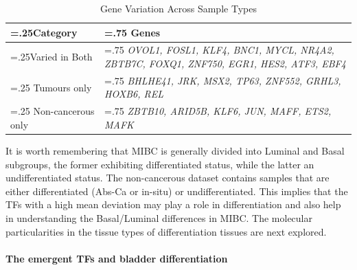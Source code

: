 \begin{table}[H]
  \centering
  \scriptsize
  \begin{tabularx}{\textwidth}{>{\hsize=.25\hsize}X|>{\hsize=.75\hsize}X}
    \toprule
    \textbf{Category} & \textbf{Genes} \\
    \midrule
    Varied in Both & \textit{OVOL1, FOSL1, KLF4, BNC1, MYCL, NR4A2, ZBTB7C, FOXQ1, ZNF750, EGR1, HES2, ATF3, EBF4} \\
    \midrule
    Tumours only & \textit{BHLHE41, JRK, MSX2, TP63, ZNF552, GRHL3, HOXB6, REL} \\
    \midrule
    Non-cancerous only & \textit{ZBTB10, ARID5B, KLF6, JUN, MAFF, ETS2, MAFK} \\
    \bottomrule
  \end{tabularx}
    \caption{Gene Variation Across Sample Types} %
    \label{tab:N_I:sel_tfs_var}
\end{table}

It is worth remembering that MIBC is generally divided into Luminal and Basal subgroups, the former exhibiting differentiated status, while the latter an undifferentiated status. The non-cancerous dataset contains samples that are either differentiated (Abs-Ca or in-situ) or undifferentiated. This implies that the TFs with a high mean deviation may play a role in differentiation and also help in understanding the Basal/Luminal differences in MIBC. The molecular particularities in the tissue types of differentiation tissues are next explored.


\paragraph*{The emergent TFs and bladder differentiation} \label{s:N:sel_tf_diff_status}

